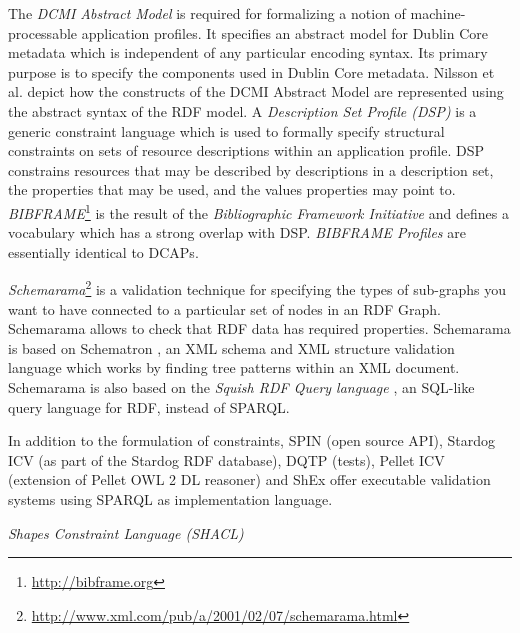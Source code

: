 \documentclass[a4paper,fontsize=11pt]{scrartcl}
\newcommand{\tb}[1]{\todo[size=\small, color=green!40]{\textbf{Thomas:} #1}}
\begin{document}
The \emph{DCMI Abstract Model} \cite{DCMI-Abstract-Model-2007} is required for formalizing a notion of machine-processable application profiles. It specifies an abstract model for Dublin Core metadata which is independent of any particular encoding syntax. Its primary purpose is to specify the components used in Dublin Core metadata. Nilsson et al. \cite{DCMI-DC-RDF-2008} depict how the constructs of the DCMI Abstract Model are represented using the abstract syntax of the RDF model. A \emph{Description Set Profile (DSP)} \cite{DCMI-DSP-2008} is a generic constraint language which is used to formally specify structural constraints on sets of resource descriptions within an application profile. DSP constrains resources that may be described by descriptions in a description set, the properties that may be used, and the values properties may point to. \emph{BIBFRAME}\footnote{\url{http://bibframe.org}} \cite{Kroeger-2013,Godby-2015,Miller-2012} is the result of the \emph{Bibliographic Framework Initiative} and defines a vocabulary \cite{DCMI-Bibframe-Authorities-2014,DCMI-Bibframe-Relationships-2014} which has a strong overlap with DSP. \emph{BIBFRAME Profiles} \cite{DCMI-Bibframe-Profiles-2014} are essentially identical to DCAPs.

\emph{Schemarama}\footnote{\url{http://www.xml.com/pub/a/2001/02/07/schemarama.html}} is a validation technique for specifying the types of sub-graphs you want to have connected to a particular set of nodes in an RDF Graph. Schemarama allows to check that RDF data has required properties. Schemarama is based on Schematron \cite{ISO/IEC-2006}, an XML schema and XML structure validation language which works by finding tree patterns within an XML document. Schemarama is also based on the \emph{Squish RDF Query language} \cite{Miller-2001}, an SQL-like query language for RDF, instead of SPARQL. 

%
%

In addition to the formulation of constraints, SPIN (open source API), Stardog ICV (as part of the Stardog RDF database), DQTP (tests), Pellet ICV (extension of Pellet OWL 2 DL reasoner) and ShEx offer executable validation systems using SPARQL as implementation language.

\tb{SHACL}

\emph{Shapes Constraint Language (SHACL)} \cite{W3C-SHACL-2015,W3C-SHACL-2-2015,W3C-SHACL-3-2015}
\end{document}
